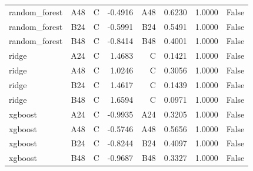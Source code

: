 \begin{table}[htbp]
\begin{tabular}{lrrrrrrr}
random\_forest & A48 & C & -0.4916 & A48 & 0.6230 & 1.0000 & False \\
random\_forest & B24 & C & -0.5991 & B24 & 0.5491 & 1.0000 & False \\
random\_forest & B48 & C & -0.8414 & B48 & 0.4001 & 1.0000 & False \\
ridge & A24 & C & 1.4683 & C & 0.1421 & 1.0000 & False \\
ridge & A48 & C & 1.0246 & C & 0.3056 & 1.0000 & False \\
ridge & B24 & C & 1.4617 & C & 0.1439 & 1.0000 & False \\
ridge & B48 & C & 1.6594 & C & 0.0971 & 1.0000 & False \\
xgboost & A24 & C & -0.9935 & A24 & 0.3205 & 1.0000 & False \\
xgboost & A48 & C & -0.5746 & A48 & 0.5656 & 1.0000 & False \\
xgboost & B24 & C & -0.8244 & B24 & 0.4097 & 1.0000 & False \\
xgboost & B48 & C & -0.9687 & B48 & 0.3327 & 1.0000 & False \\
\bottomrule
\end{tabular}
\end{table}
